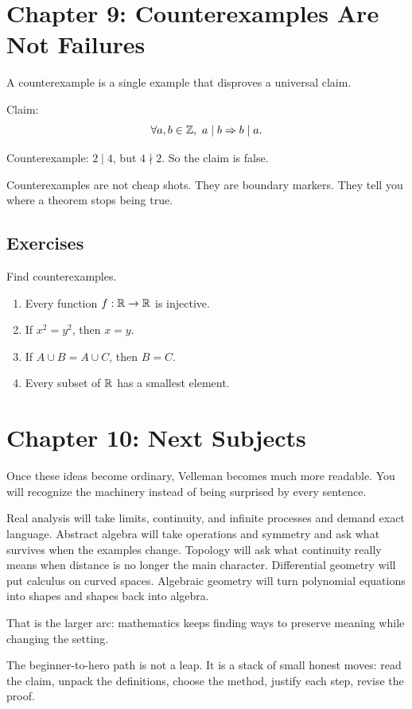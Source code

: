 \documentclass[11pt]{article}
\begin{document}
\section{Chapter 9: Counterexamples Are Not Failures}

A counterexample is a single example that disproves a universal claim.

Claim:
\[
\forall a,b\in\mathbb{Z},\ a\mid b\Rightarrow b\mid a.
\]

Counterexample: $2\mid 4$, but $4\nmid 2$. So the claim is false.

Counterexamples are not cheap shots. They are boundary markers. They tell you where a theorem stops being true.

\subsection{Exercises}

Find counterexamples.

\begin{enumerate}
\item Every function $f:\mathbb{R}\to\mathbb{R}$ is injective.
\item If $x^2=y^2$, then $x=y$.
\item If $A\cup B=A\cup C$, then $B=C$.
\item Every subset of $\mathbb{R}$ has a smallest element.
\end{enumerate}

\section{Chapter 10: Next Subjects}

Once these ideas become ordinary, Velleman becomes much more readable. You will recognize the machinery instead of being surprised by every sentence.

Real analysis will take limits, continuity, and infinite processes and demand exact language. Abstract algebra will take operations and symmetry and ask what survives when the examples change. Topology will ask what continuity really means when distance is no longer the main character. Differential geometry will put calculus on curved spaces. Algebraic geometry will turn polynomial equations into shapes and shapes back into algebra.

That is the larger arc: mathematics keeps finding ways to preserve meaning while changing the setting.

\begin{focusbox}
The beginner-to-hero path is not a leap. It is a stack of small honest moves: read the claim, unpack the definitions, choose the method, justify each step, revise the proof.
\end{focusbox}
\end{document}
